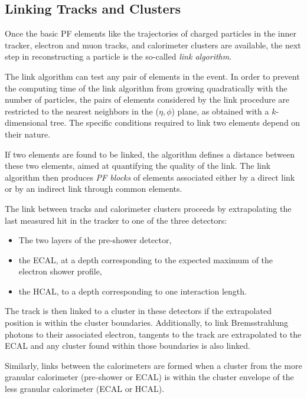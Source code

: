 \subsection{Linking Tracks and Clusters}
Once the basic PF elements like the trajectories of charged particles in the inner tracker, electron and muon tracks, and calorimeter clusters are available, the next step in reconstructing a particle is the so-called \textit{link algorithm}.

 The link algorithm can test any pair of elements in the event. In order to prevent the computing time of the link algorithm from growing quadratically with the number of particles, the pairs of elements considered by the link procedure are restricted to the nearest neighbors in the ($\eta,\phi$) plane, as obtained with a $k$-dimensional tree\cite{Bentley1975MultidimensionalBS}. The specific conditions required to link two elements depend on their nature.

 If two elements are found to be linked, the algorithm defines a distance between these two elements, aimed at quantifying the quality of the link. The link algorithm then produces \textit{PF blocks} of elements associated either by a direct link or by an indirect link through common elements.

 The link between tracks and calorimeter clusters proceeds by extrapolating the last measured hit in the tracker to one of the three detectors\cite{CMS:2009nxa}:

 \begin{itemize}
 	\item The two layers of the pre-shower detector,
 	\item the ECAL, at a depth corresponding to the expected maximum of the electron shower profile,
 	\item the HCAL, to a depth corresponding to one interaction length.
 \end{itemize}

 The track is then linked to a cluster in these detectors if the extrapolated position is within the cluster boundaries. Additionally, to link Bremsstrahlung photons to their associated electron, tangents to the track are extrapolated to the ECAL and any cluster found within those boundaries is also linked.

 Similarly, links between the calorimeters are formed when a cluster from the more granular calorimeter (pre-shower or ECAL) is within the cluster envelope of the less granular calorimeter (ECAL or HCAL).

